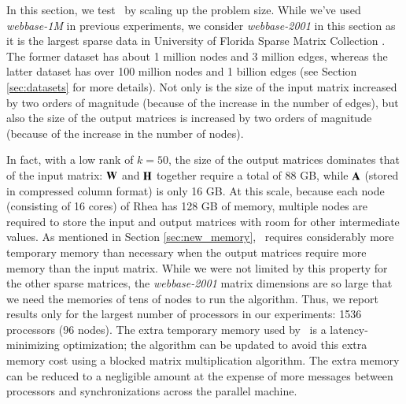 In this section, we test \ParNMF\ by scaling up the problem size.
While we've used \emph{webbase-1M} in previous experiments, we consider \emph{webbase-2001} in this section as it is the largest sparse data in University of Florida Sparse Matrix Collection \cite{DH11}.
The former dataset has about 1 million nodes and 3 million edges, whereas the latter dataset has over 100 million nodes and  1 billion edges (see Section \ref{sec:datasets} for more details).
Not only is the size of the input matrix increased by two orders of magnitude (because of the increase in the number of edges), but also the size of the output matrices is increased by two orders of magnitude (because of the increase in the number of nodes).

In fact, with a low rank of $k=50$, the size of the output matrices dominates that of the input matrix: $\WW$ and $\HH$ together require a total of 88 GB, while $\AA$ (stored in compressed column format) is only 16 GB.
At this scale, because each node (consisting of 16 cores) of Rhea has 128 GB of memory, multiple nodes are required to store the input and output matrices with room for other intermediate values.
As mentioned in Section \ref{sec:new_memory}, \ParNMF\ requires considerably more temporary memory than necessary when the output matrices require more memory than the input matrix.
While we were not limited by this property for the other sparse matrices, the \emph{webbase-2001} matrix dimensions are so large that we need the memories of tens of nodes to run the algorithm.
Thus, we report results only for the largest number of processors in our experiments: 1536 processors (96 nodes).
The extra temporary memory used by \ParNMF\ is a latency-minimizing optimization; the algorithm can be updated to avoid this extra memory cost using a blocked matrix multiplication algorithm.
The extra memory can be reduced to a negligible amount at the expense of more messages between processors and synchronizations across the parallel machine.


